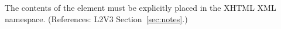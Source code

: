 The contents of the  element must be explicitly placed in the
XHTML XML namespace.  (References: L2V3 Section~\ref{sec:notes}.)
